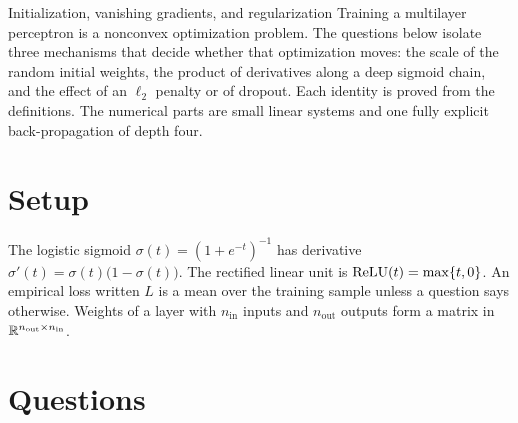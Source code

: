



  {Initialization, vanishing gradients, and regularization}
  {Training a multilayer perceptron is a nonconvex optimization problem. The questions below isolate three mechanisms that decide whether that optimization moves: the scale of the random initial weights, the product of derivatives along a deep sigmoid chain, and the effect of an \(\ell_2\) penalty or of dropout. Each identity is proved from the definitions. The numerical parts are small linear systems and one fully explicit back-propagation of depth four.}

\section{Setup}

The logistic sigmoid \(\sigma(t)=(1+e^{-t})^{-1}\) has derivative \(\sigma'(t)=\sigma(t)\bigl(1-\sigma(t)\bigr)\). The rectified linear unit is \(\operatorname{ReLU}(t)=\max\{t,0\}\). An empirical loss written \(L\) is a mean over the training sample unless a question says otherwise. Weights of a layer with \(n_{\mathrm{in}}\) inputs and \(n_{\mathrm{out}}\) outputs form a matrix in \(\mathbb{R}^{n_{\mathrm{out}}\times n_{\mathrm{in}}}\).

\section{Questions}

